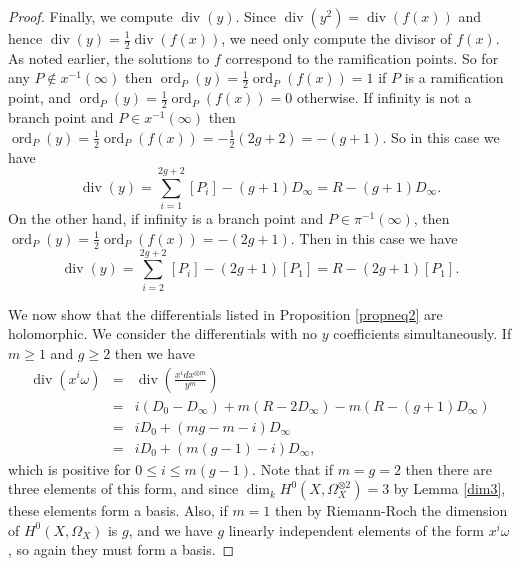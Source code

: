 \documentclass[11pt]{article} %
\theoremstyle{plain}
\theoremstyle{remark}
\newcommand{\cL}{{\mathcal L}}
\DeclareMathOperator{\ord}{ord}
\DeclareMathOperator{\di}{div}
\begin{document}
\begin{proof}
Finally, we compute $\di (y)$.
Since $\di (y^2) = \di (f(x))$ and hence $\di(y) = \frac{1}{2}\di(f(x))$, we need only compute the divisor of $f(x)$.
As noted earlier, the solutions to $f$ correspond to the ramification points.
So for any $P\notin x^{-1}(\infty)$ then $\ord_P(y) =  \frac{1}{2}\ord_P(f(x)) = 1$ if $P$ is a ramification point, and $\ord_P(y) = \frac{1}{2}\ord_P(f(x)) = 0$ otherwise.
If infinity is not a branch point and $P\in x^{-1}(\infty)$ then $\ord_P(y)  = \frac{1}{2}\ord_P(f(x)) = - \frac{1}{2} (2g+2) = -(g+1)$.
So in this case we have
\[
 \di(y) = \sum_{i=1}^{2g+2} [P_i]- (g+1)D_\infty = R - (g+1)D_{\infty}.
 \]
On the other hand, if infinity is a branch point and $P\in \pi^{-1}(\infty)$, then $\ord_P(y)  = \frac{1}{2}\ord_P(f(x)) = - (2g+1)$.
Then in this case we have 
\[
 \di(y) = \sum_{i=2}^{2g+2} [P_i] - (2g+1)[P_1] = R - (2g+1)[P_1].
 \]
\begin{comment}
Firstly, since $y(p_i)= y(j(p_i)) = j^*(y)(p_i)= -y(p_i)$ for all $i$ we see that $y(p_i)=0$.
Therefore $\deg(y)_0 \geq \deg\left(\sum_{i = 1}^{2g +2} [p_i] \right) = 2g+2$.
But since $y\in \cL(D)$, we know that $\deg(y)_{\infty} \leq \deg((g+1)D) = 2g + 2$, and as $\deg(y) = \deg(y)_0 - \deg(y)_{\infty} = 0$ then $\deg(y)_0 = \deg(y)_{\infty} = 2g+2$.
So
\[
 (y)_0 = \sum_{i=1}^{2g+2} [p_i], \ (y)_{\infty} = (g+1)D_\infty.
\]
\end{comment}

We now show that the differentials listed in Proposition \ref{propneq2} are holomorphic.
We consider the differentials with no $y$ coefficients simultaneously.
If $m\geq 1$ and $g\geq 2$ then we have 
\begin{eqnarray*}
 \di(x^i\omega) & = & \di \left( \frac{x^idx^{\otimes m}}{y^m} \right)\\ & = & i(D_0 -D_\infty) + m(R-2D_\infty) -m(R-(g+1)D_\infty) \\
 & = & iD_0 + (mg -m -i)D_\infty \\
 & = & iD_0 + (m(g-1) -i)D_\infty,
\end{eqnarray*}
which is positive for $0\leq i \leq m(g-1)$.
Note that if $m=g=2$ then there are three elements of this form, and since $\dim_kH^0(X,\Omega_X^{\otimes 2})=3$ by Lemma \ref{dim3}, these elements form a basis.
Also, if $m=1$ then by Riemann-Roch the dimension of $H^0(X,\Omega_X)$ is $g$, and we have $g$ linearly independent elements of the form $x^i\omega$, so again they must form a basis.

\begin{comment}
If $m=g=2$ then we have that
\begin{eqnarray*}
 \di\left(\frac{x^idx^{\otimes 2}}{y^2}\right) & = & i(D_0-D_\infty) + 2(R-2D_\infty) - 2(R-(g+1)D_\infty) \\
 & = & iD_0+ ((2g-2)-i)D_\infty \\
 & = & iD_0 +(2-i)D_\infty,
\end{eqnarray*}
which is positive for $0\leq 2$.
By Lemma \ref{dim3} then $\dim_kH^0(X,\Omega_X^{\otimes 2})=3$, so again, we have three linearly independent elements, so they must form a basis.
\end{comment}



\end{proof}
\end{document}
